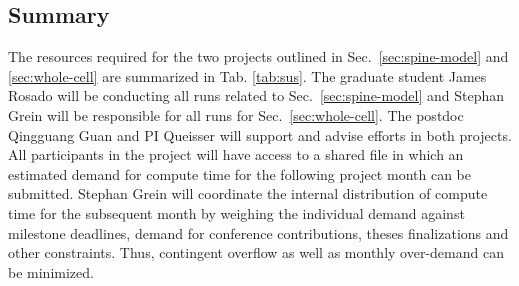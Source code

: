 \subsection{Summary}
The resources required for the two projects outlined in Sec.~\ref{sec:spine-model} and \ref{sec:whole-cell} are summarized in Tab. \ref{tab:sus}. The graduate student James Rosado will be conducting all runs related to Sec.~\ref{sec:spine-model} and Stephan Grein will be responsible for all runs for Sec.~\ref{sec:whole-cell}. The postdoc Qingguang Guan and PI Queisser will support and advise efforts in both projects. \\

All participants in the project will have access to a shared file in which an estimated demand for compute time for the following project month can be submitted. Stephan Grein will coordinate the internal distribution of compute time for the subsequent month by weighing the individual demand against milestone deadlines, demand for conference contributions, theses finalizations and other constraints. Thus, contingent overflow as well as monthly over-demand can be minimized.\\\\

